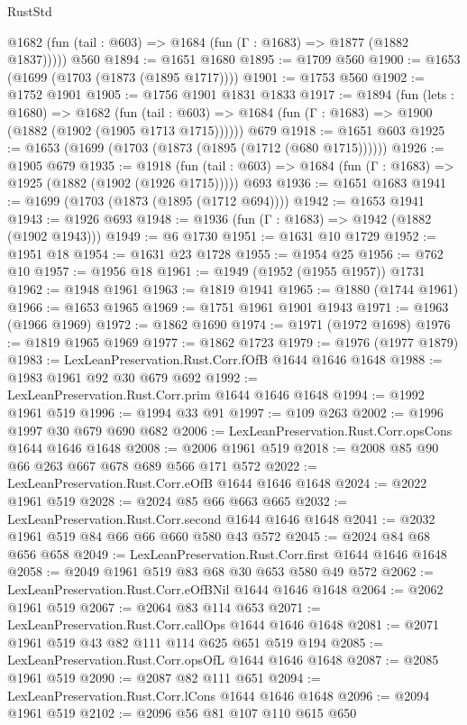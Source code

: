 \begin{lexlean}{RustStd}
\begin{coremodule}
      @1682 (fun (tail : @603) => @1684 (fun (Γ : @1683) => @1877 (@1882 @1837)))))
    @560
@1894 := @1651 @1680
@1895 := @1709 @560
@1900 := @1653 (@1699 (@1703 (@1873 (@1895 @1717))))
@1901 := @1753 @560
@1902 := @1752 @1901
@1905 := @1756 @1901 @1831 @1833
@1917 := @1894
    (fun (lets : @1680) =>
    @1682
      (fun (tail : @603) => @1684 (fun (Γ : @1683) => @1900 (@1882 (@1902 (@1905 @1713 @1715))))))
    @679
@1918 := @1651 @603
@1925 := @1653 (@1699 (@1703 (@1873 (@1895 (@1712 (@680 @1715))))))
@1926 := @1905 @679
@1935 := @1918
    (fun (tail : @603) => @1684 (fun (Γ : @1683) => @1925 (@1882 (@1902 (@1926 @1715)))))
    @693
@1936 := @1651 @1683
@1941 := @1699 (@1703 (@1873 (@1895 (@1712 @694))))
@1942 := @1653 @1941
@1943 := @1926 @693
@1948 := @1936 (fun (Γ : @1683) => @1942 (@1882 (@1902 @1943)))
@1949 := @6 @1730
@1951 := @1631 @10 @1729
@1952 := @1951 @18
@1954 := @1631 @23 @1728
@1955 := @1954 @25
@1956 := @762 @10
@1957 := @1956 @18
@1961 := @1949 (@1952 (@1955 @1957)) @1731
@1962 := @1948 @1961
@1963 := @1819 @1941
@1965 := @1880 (@1744 @1961)
@1966 := @1653 @1965
@1969 := @1751 @1961 @1901 @1943
@1971 := @1963 (@1966 @1969)
@1972 := @1862 @1690
@1974 := @1971 (@1972 @1698)
@1976 := @1819 @1965 @1969
@1977 := @1862 @1723
@1979 := @1976 (@1977 @1879)
@1983 := LexLeanPreservation.Rust.Corr.fOfB @1644 @1646 @1648
@1988 := @1983 @1961 @92 @30 @679 @692
@1992 := LexLeanPreservation.Rust.Corr.prim @1644 @1646 @1648
@1994 := @1992 @1961 @519
@1996 := @1994 @33 @91
@1997 := @109 @263
@2002 := @1996 @1997 @30 @679 @690 @682
@2006 := LexLeanPreservation.Rust.Corr.opsCons @1644 @1646 @1648
@2008 := @2006 @1961 @519
@2018 := @2008 @85 @90 @66 @263 @667 @678 @689 @566 @171 @572
@2022 := LexLeanPreservation.Rust.Corr.eOfB @1644 @1646 @1648
@2024 := @2022 @1961 @519
@2028 := @2024 @85 @66 @663 @665
@2032 := LexLeanPreservation.Rust.Corr.second @1644 @1646 @1648
@2041 := @2032 @1961 @519 @84 @66 @66 @660 @580 @43 @572
@2045 := @2024 @84 @68 @656 @658
@2049 := LexLeanPreservation.Rust.Corr.first @1644 @1646 @1648
@2058 := @2049 @1961 @519 @83 @68 @30 @653 @580 @49 @572
@2062 := LexLeanPreservation.Rust.Corr.eOfBNil @1644 @1646 @1648
@2064 := @2062 @1961 @519
@2067 := @2064 @83 @114 @653
@2071 := LexLeanPreservation.Rust.Corr.callOps @1644 @1646 @1648
@2081 := @2071 @1961 @519 @43 @82 @111 @114 @625 @651 @519 @194
@2085 := LexLeanPreservation.Rust.Corr.opsOfL @1644 @1646 @1648
@2087 := @2085 @1961 @519
@2090 := @2087 @82 @111 @651
@2094 := LexLeanPreservation.Rust.Corr.lCons @1644 @1646 @1648
@2096 := @2094 @1961 @519
@2102 := @2096 @56 @81 @107 @110 @615 @650

\end{coremodule}
\end{lexlean}

